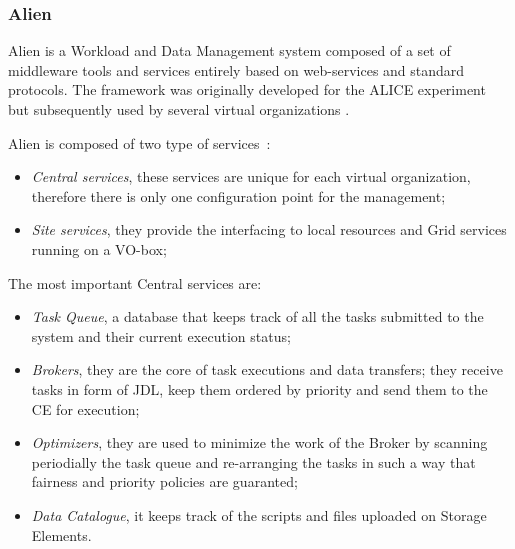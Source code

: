 \subsubsection{Alien}

Alien is a Workload and Data Management system composed of a set of middleware
tools and services entirely based on web-services and standard protocols. The
framework was originally developed for the ALICE experiment~\cite{Alice1995} but
subsequently used by several virtual organizations
\cite{McClatechey2003,GPCALMA}.


Alien is composed of two type of services~\cite{Bagnasco2010}:

\begin{itemize}
    \item \emph{Central services}, these services are unique for each virtual organization, therefore there is only one configuration point for the management;
    \item \emph{Site services}, they provide the interfacing to local resources and Grid services running on a VO-box;
\end{itemize}

The most important Central services are:
\begin{itemize}
    \item \emph{Task Queue}, a database that keeps track of all the tasks submitted to the system and their current execution status;
    \item \emph{Brokers}, they are the core of task executions and data transfers; they receive tasks in form of JDL,  keep them ordered by priority and send them to the CE for execution;
    \item \emph{Optimizers}, they are used to minimize the work of the Broker by scanning periodially the task queue and re-arranging the tasks in such a way that fairness and priority policies are guaranted;
    \item \emph{Data Catalogue}, it keeps track of the scripts and files uploaded on Storage Elements.
\end{itemize}


